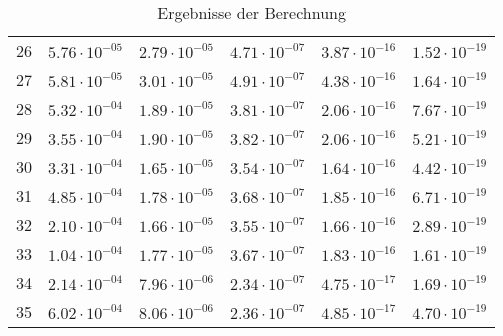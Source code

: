 \begin{table}[h]
\begin{tabular}{llllll}
		26 &$\mathrm{5.76 \cdot 10^{-05}}$ & $\mathrm{2.79 \cdot 10^{-05}}$ & $\mathrm{4.71 \cdot 10^{-07}}$ & $\mathrm{3.87 \cdot 10^{-16}}$ & $\mathrm{1.52 \cdot 10^{-19}}$ \\
		27 &$\mathrm{5.81 \cdot 10^{-05}}$ & $\mathrm{3.01 \cdot 10^{-05}}$ & $\mathrm{4.91 \cdot 10^{-07}}$ & $\mathrm{4.38 \cdot 10^{-16}}$ & $\mathrm{1.64 \cdot 10^{-19}}$ \\
		28 &$\mathrm{5.32 \cdot 10^{-04}}$ & $\mathrm{1.89 \cdot 10^{-05}}$ & $\mathrm{3.81 \cdot 10^{-07}}$ & $\mathrm{2.06 \cdot 10^{-16}}$ & $\mathrm{7.67 \cdot 10^{-19}}$ \\
		29 &$\mathrm{3.55 \cdot 10^{-04}}$ & $\mathrm{1.90 \cdot 10^{-05}}$ & $\mathrm{3.82 \cdot 10^{-07}}$ & $\mathrm{2.06 \cdot 10^{-16}}$ & $\mathrm{5.21 \cdot 10^{-19}}$ \\
		30 &$\mathrm{3.31 \cdot 10^{-04}}$ & $\mathrm{1.65 \cdot 10^{-05}}$ & $\mathrm{3.54 \cdot 10^{-07}}$ & $\mathrm{1.64 \cdot 10^{-16}}$ & $\mathrm{4.42 \cdot 10^{-19}}$ \\
		31 &$\mathrm{4.85 \cdot 10^{-04}}$ & $\mathrm{1.78 \cdot 10^{-05}}$ & $\mathrm{3.68 \cdot 10^{-07}}$ & $\mathrm{1.85 \cdot 10^{-16}}$ & $\mathrm{6.71 \cdot 10^{-19}}$ \\
		32 &$\mathrm{2.10 \cdot 10^{-04}}$ & $\mathrm{1.66 \cdot 10^{-05}}$ & $\mathrm{3.55 \cdot 10^{-07}}$ & $\mathrm{1.66 \cdot 10^{-16}}$ & $\mathrm{2.89 \cdot 10^{-19}}$ \\
		33 &$\mathrm{1.04 \cdot 10^{-04}}$ & $\mathrm{1.77 \cdot 10^{-05}}$ & $\mathrm{3.67 \cdot 10^{-07}}$ & $\mathrm{1.83 \cdot 10^{-16}}$ & $\mathrm{1.61 \cdot 10^{-19}}$ \\
		34 &$\mathrm{2.14 \cdot 10^{-04}}$ & $\mathrm{7.96 \cdot 10^{-06}}$ & $\mathrm{2.34 \cdot 10^{-07}}$ & $\mathrm{4.75 \cdot 10^{-17}}$ & $\mathrm{1.69 \cdot 10^{-19}}$ \\
		35 &$\mathrm{6.02 \cdot 10^{-04}}$ & $\mathrm{8.06 \cdot 10^{-06}}$ & $\mathrm{2.36 \cdot 10^{-07}}$ & $\mathrm{4.85 \cdot 10^{-17}}$ & $\mathrm{4.70 \cdot 10^{-19}}$ \\
		\bottomrule
	\end{tabular}
	\caption{Ergebnisse der Berechnung}
	\label{tab:ergebnisse}
\end{table}
